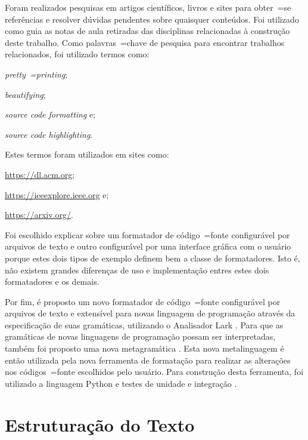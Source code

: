 Foram realizados pesquisas em artigos científicos,
livros e
sites para obter~=se referências e
resolver dúvidas pendentes sobre quaisquer conteúdos.
Foi utilizado como guia as notas de aula retiradas das disciplinas relacionadas à construção deste trabalho.
Como palavras~=chave de pesquisa para encontrar trabalhos relacionados,
foi utilizado termos como:
\begin{inparaenum}[1)]
\item \textit{pretty~=printing};
\item \textit{beautifying};
\item \textit{source code formatting} e;
\item \textit{source code highlighting}.
\end{inparaenum}%
Estes termos foram utilizados em sites como:
\begin{inparaenum}[1)]
\item \url{https://dl.acm.org};
\item \url{https://ieeexplore.ieee.org} e;
\item \url{https://arxiv.org/}.
\end{inparaenum}%

Foi escolhido explicar sobre um formatador de código~=fonte configurável por arquivos de texto e
outro configurável por uma interface gráfica com o usuário porque estes dois tipos de exemplo definem bem a classe de formatadores.
Isto é,
não existem grandes diferenças de uso e
implementação entres estes dois formatadores e
os demais.

Por fim,
é proposto um novo formatador de código~=fonte configurável por arquivos de texto e
extensível para novas linguagem de programação através da especificação de suas gramáticas,
utilizando o Analisador Lark \cite{larkContextualLexer}.
Para que as gramáticas de novas linguagens de programação possam ser interpretadas,
também foi proposto uma nova metagramática \cite{theUseOfMetaRules}.
Esta nova metalinguagem \cite{compilersCompilerMetaLanguage} é então utilizada pela nova ferramenta de formatação para realizar as alterações nos códigos~=fonte escolhidos pelo usuário.
Para construção desta ferramenta,
foi utilizado a linguagem Python e
testes de unidade e
integração \cite{continuousIntegration}.


\section{Estruturação do Texto}

